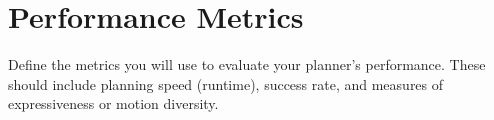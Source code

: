 \section{Performance Metrics}

\begin{outline}
  Define the metrics you will use to evaluate your planner's performance. These should include planning speed (runtime), success rate, and measures of expressiveness or motion diversity.
\end{outline}
